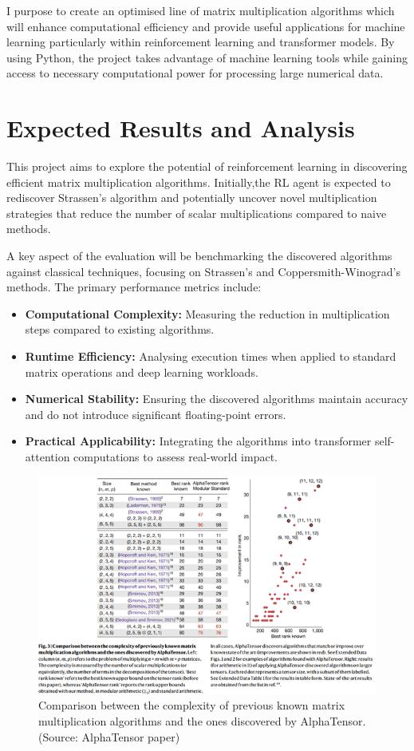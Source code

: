 \documentclass{article}
\begin{document}
I purpose to create an optimised line of matrix multiplication algorithms which will enhance computational efficiency and provide useful applications for machine learning particularly within reinforcement learning and transformer models. By using Python, the project takes advantage of machine learning tools while gaining access to necessary computational power for processing large numerical data.

\section{Expected Results and Analysis}
This project aims to explore the potential of reinforcement learning in discovering efficient matrix multiplication algorithms. Initially,the RL agent is expected to rediscover Strassen's algorithm and potentially uncover novel multiplication strategies that reduce the number of scalar multiplications compared to naive methods.  

A key aspect of the evaluation will be benchmarking the discovered algorithms against classical techniques, focusing on Strassen's and Coppersmith-Winograd's methods. The primary performance metrics include:  

\begin{itemize}
    \item \textbf{Computational Complexity:} Measuring the reduction in multiplication steps compared to existing algorithms.
    \item \textbf{Runtime Efficiency:} Analysing execution times when applied to standard matrix operations and deep learning workloads.
    \item \textbf{Numerical Stability:} Ensuring the discovered algorithms maintain accuracy and do not introduce significant floating-point errors.
    \item \textbf{Practical Applicability:} Integrating the algorithms into transformer self-attention computations to assess real-world impact.
\end{itemize}

\begin{figure}[H]
    \centering
    \includegraphics[width=0.6\linewidth]{Picture4.png}
    \caption{Comparison between the complexity of previous known matrix multiplication algorithms and the ones discovered by AlphaTensor. (Source: AlphaTensor paper)}
    \label{fig:comparison-alphatensor}
\end{figure}
\end{document}
